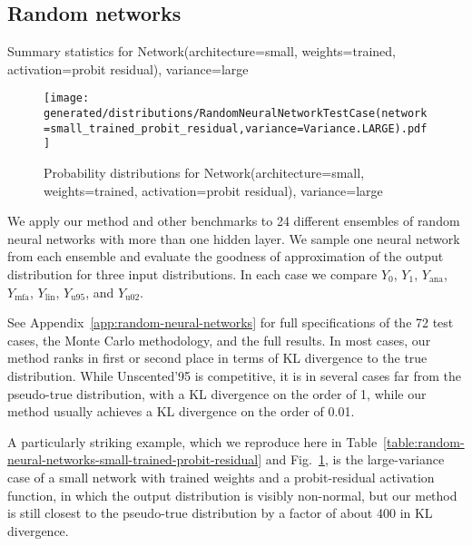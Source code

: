 \documentclass{article}
\begin{document}
\subsection{Random networks}
\label{sec:random-networks}

\begin{table}\begin{center}
\end{center}
\caption{\label{table:random-neural-networks-small-trained-probit-residual}Summary statistics for Network(architecture=small, weights=trained, activation=probit residual), variance=large}
\end{table}
\begin{figure}\begin{center}
\texttt{[image: generated/distributions/RandomNeuralNetworkTestCase(network=small\_trained\_probit\_residual,variance=Variance.LARGE).pdf]}
\end{center}
\caption{\label{fig:random-neural-networks-small-trained-probit-residual}Probability distributions for Network(architecture=small, weights=trained, activation=probit residual), variance=large}
\end{figure}
We apply our method and other benchmarks to 24 different ensembles of random neural networks with more than one hidden layer.
We sample one neural network from each ensemble and evaluate the goodness of approximation of the output distribution for three input distributions.
In each case we compare \(Y_0\), \(Y_1\), \(Y_\mathrm{ana}\), \(Y_\mathrm{mfa}\), \(Y_\mathrm{lin}\), \(Y_\mathrm{u95}\), and \(Y_\mathrm{u02}\).


See Appendix~\ref{app:random-neural-networks} for full specifications of the 72 test cases, the Monte Carlo methodology, and the full results.
In most cases, our method ranks in first or second place in terms of KL divergence to the true distribution.
While Unscented'95 is competitive, it is in several cases far from the pseudo-true distribution, with a KL divergence on the order of 1, while our method usually achieves a KL divergence on the order of 0.01.

A particularly striking example, which we reproduce here in Table~\ref{table:random-neural-networks-small-trained-probit-residual} and Fig.~\ref{fig:random-neural-networks-small-trained-probit-residual}, is the large-variance case of a small network with trained weights and a probit-residual activation function, in which the output distribution is visibly non-normal, but our method is still closest to the pseudo-true distribution by a factor of about 400 in KL divergence.
\end{document}
